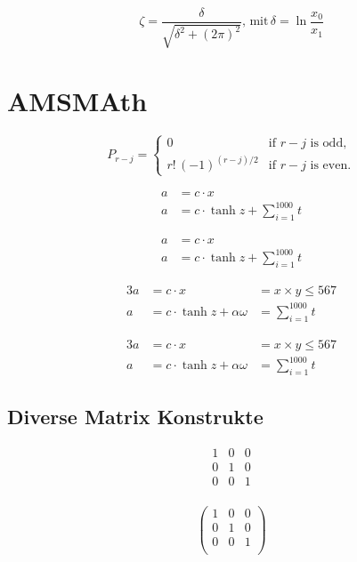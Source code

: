 \documentclass[12pt,ngerman,parskip=half]{scrartcl}
\begin{document}
\begin{equation}
\zeta = \frac{\delta}{\sqrt{\delta^{2} + (2 \pi)^2}} \text{, mit} \, \delta = \ln        \frac{x_0}{x_1}
\end{equation}

\section{AMSMAth}

\begin{equation}
P_{r-j}=\begin{cases}
0& \text{if $r-j$ is odd},\\
r!\,(-1)^{(r-j)/2}& \text{if $r-j$ is even}.
\end{cases}
\end{equation}

\begin{align} %
a &= c \cdot x \\
a &= c \cdot \tanh z + \sum_{i=1}^{1000} t
\end{align}

\begin{align*} %
a &= c \cdot x \\
a &= c \cdot \tanh z + \sum_{i=1}^{1000} t
\end{align*}

\begin{alignat}{3}
a &= c \cdot x &= x\times y \leq 567 \\
a &= c \cdot \tanh z + \alpha\omega &= \sum_{i=1}^{1000} t
\end{alignat}

\begin{alignat*}{3}
a &= c \cdot x &= x\times y \leq 567 \\
a &= c \cdot \tanh z + \alpha\omega &= \sum_{i=1}^{1000} t
\end{alignat*}

\subsection{Diverse Matrix Konstrukte}



\[%
\begin{matrix} 
1 & 0 & 0 \\ 
0 & 1 & 0 \\ 
0 & 0 & 1 \\ 
\end{matrix}
\]


\[%
\begin{pmatrix} 
1 & 0 & 0 \\ 
0 & 1 & 0 \\ 
0 & 0 & 1 \\ 
\end{pmatrix}
\]
\end{document}
